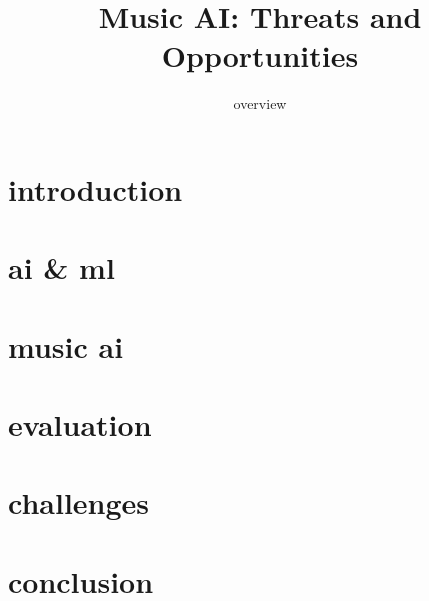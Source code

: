 
\usepackage{multirow}
\AtBeginBibliography{\tiny}

\title{Music AI: Threats and Opportunities}
\subtitle{overview} 


	

    \section[intro]{introduction}
        

    \section{ai \& ml}
        
        
    \section{music ai}
        
        
    \section{evaluation}
        
    
    \section[current state]{challenges}
        
        
    \section{conclusion}
        
        
    


